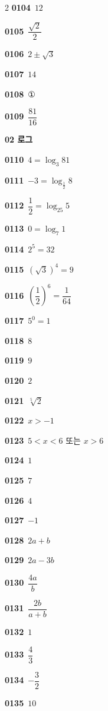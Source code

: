 \documentclass[10pt,a4paper]{article}
\begin{document}
\begin{multicols}{2}
\noindent\textbf{0104}\ $12$\par
\noindent\textbf{0105}\ $\dfrac{\sqrt{2}}{2}$\par
\noindent\textbf{0106}\ $2\pm\sqrt{3}$\par
\noindent\textbf{0107}\ $14$\par
\noindent\textbf{0108}\ ①\par
\noindent\textbf{0109}\ $\dfrac{81}{16}$\par
\noindent\textbf{02 로그}\par\smallskip
\noindent\textbf{0110}\ $4=\log_3 81$\par
\noindent\textbf{0111}\ $-3=\log_{\frac{1}{2}} 8$\par
\noindent\textbf{0112}\ $\dfrac{1}{2}=\log_{25} 5$\par
\noindent\textbf{0113}\ $0=\log_7 1$\par
\noindent\textbf{0114}\ $2^5=32$\par
\noindent\textbf{0115}\ $(\sqrt{3})^4=9$\par
\noindent\textbf{0116}\ $\left(\dfrac{1}{2}\right)^6=\dfrac{1}{64}$\par
\noindent\textbf{0117}\ $5^0=1$\par
\noindent\textbf{0118}\ $8$\par
\noindent\textbf{0119}\ $9$\par
\noindent\textbf{0120}\ $2$\par
\noindent\textbf{0121}\ $\sqrt[5]{2}$\par
\noindent\textbf{0122}\ $x>-1$\par
\noindent\textbf{0123}\ $5<x<6$ 또는 $x>6$\par
\noindent\textbf{0124}\ $1$\par
\noindent\textbf{0125}\ $7$\par
\noindent\textbf{0126}\ $4$\par
\noindent\textbf{0127}\ $-1$\par
\noindent\textbf{0128}\ $2a+b$\par
\noindent\textbf{0129}\ $2a-3b$\par
\noindent\textbf{0130}\ $\dfrac{4a}{b}$\par
\noindent\textbf{0131}\ $\dfrac{2b}{a+b}$\par
\noindent\textbf{0132}\ $1$\par
\noindent\textbf{0133}\ $\dfrac{4}{3}$\par
\noindent\textbf{0134}\ $-\dfrac{3}{2}$\par
\noindent\textbf{0135}\ $10$\par

\end{multicols}
\end{document}
